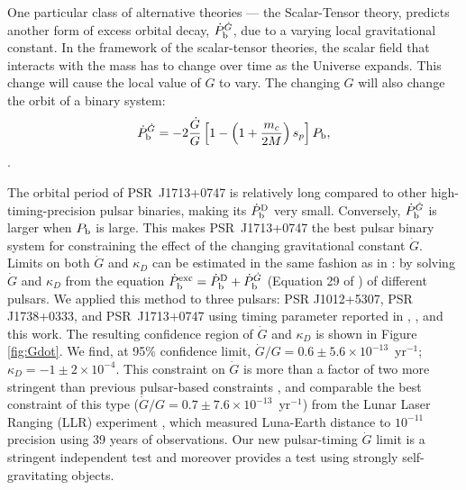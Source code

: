 One particular class of alternative theories --- the Scalar-Tensor theory,
predicts another form of excess orbital decay, $\dot{P}_{\rm b}^{\dot{G}}$,
due to a varying
local gravitational constant. In the framework of the scalar-tensor theories,
the scalar field that interacts with the mass has to change over time as the
Universe expands. This change will cause the local value of
$G$ to vary. The changing $G$ will also change
the orbit of a binary system:
\begin{equation}
\dot{P}_{\rm b}^{\dot{G}} = -2 \frac{\dot{G}}{G}
\left[1-\left(1+\frac{m_c}{2M}\right)s_p\right]P_{\rm b},
\end{equation} \citep{dgt88,nor90}.

The orbital period of PSR~J1713+0747 is relatively long compared to other
high-timing-precision pulsar binaries, making its $\dot{P}_{\rm b}^{\rm D}$
very small. Conversely, $\dot{P}_{\rm b}^{\dot{G}}$ is larger when $P_{\rm b}$
is large. This makes PSR~J1713+0747 the best pulsar binary system for constraining
the effect of the changing gravitational constant $\dot{G}$. Limits 
on both $\dot{G}$ and $\kappa_D$ can be estimated in the same fashion as in
\citet{lwj+09}: by solving $\dot{G}$ and $\kappa_D$
from the equation $\dot{P}_{\rm b}^{\rm exc} = \dot{P}_{\rm b}^{\rm D} +
\dot{P}_{\rm b}^{\dot{G}}$ (Equation 29 of \citealt{lwj+09}) of different
pulsars. We applied this method to three pulsars: PSR J1012+5307, PSR
J1738+0333, and PSR~J1713+0747 using timing parameter reported in
\citet{lwj+09}, \citet{fwe+12}, and this work.
The resulting confidence region of $\dot{G}$ and $\kappa_D$ is shown in Figure
\ref{fig:Gdot}.
We find, at 95\% confidence limit, $\dot{G}/G =
0.6\pm5.6\times10^{-13}$~yr$^{-1}$; $\kappa_D=-1\pm2\times10^{-4}$. 
This constraint on $\dot{G}$ is more than a factor of two more stringent than
previous pulsar-based constraints \citep{fwe+12}, and comparable
the best constraint of this type
($\dot{G}/G=0.7\pm7.6\times10^{-13}$~yr$^{-1}$) from the Lunar Laser Ranging
(LLR)
experiment \citep{hmb10}, which measured Luna-Earth distance to $10^{-11}$
precision using 39 years of observations.
Our new pulsar-timing  $\dot{G}$ limit is a stringent independent test
and moreover provides a test using strongly self-gravitating objects.

